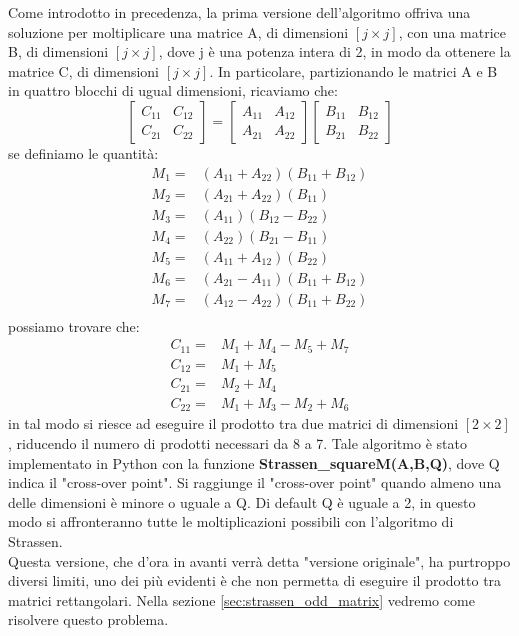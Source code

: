 \documentclass[10pt,a4paper,twoside]{tau-book}
\begin{document}
Come introdotto in precedenza, la prima versione dell'algoritmo offriva una soluzione per moltiplicare una matrice A, di dimensioni $[j\times j]$, con una matrice B, di dimensioni $[j\times j]$, dove j è una potenza intera di 2, in modo da ottenere la matrice C, di dimensioni $[j\times j]$. In particolare, partizionando le matrici A e B in quattro blocchi di ugual dimensioni, ricaviamo che:
\begin{equation}
    \begin{bmatrix} C_{11} & C_{12} \\ C_{21} & C_{22} \end{bmatrix} = \begin{bmatrix} A_{11} & A_{12} \\ A_{21} & A_{22} \end{bmatrix} \begin{bmatrix} B_{11} & B_{12} \\ B_{21} & B_{22} \end{bmatrix}
\end{equation}
se definiamo le quantità:
\begin{equation}
\begin{aligned}
    M_1 =& (A_{11}+A_{22})(B_{11}+B_{12}) \\
    M_2 =& (A_{21}+A_{22})(B_{11}) \\
    M_3 =& (A_{11})(B_{12}-B_{22}) \\
    M_4 =& (A_{22})(B_{21}-B_{11}) \\
    M_5 =& (A_{11}+A_{12})(B_{22}) \\
    M_6 =& (A_{21}-A_{11})(B_{11}+B_{12}) \\
    M_7 =& (A_{12}-A_{22})(B_{11}+B_{22}) \\
\end{aligned}
\end{equation}
possiamo trovare che:
\begin{equation}
\label{eq:strassen_sums}
\begin{aligned}
    C_{11} =& M_1 + M_4 - M_5 + M_7 \\
    C_{12} =& M_1 + M_5 \\
    C_{21} =& M_2 + M_4 \\
    C_{22} =& M_1 + M_3 - M_2 + M_6
\end{aligned}
\end{equation}
in tal modo si riesce ad eseguire il prodotto tra due matrici di dimensioni $[2\times 2]$, riducendo il numero di prodotti necessari da 8 a 7. Tale algoritmo è stato implementato in Python con la funzione \textbf{Strassen\_squareM(A,B,Q)}, dove Q indica il "cross-over point". Si raggiunge il "cross-over point" quando almeno una delle dimensioni è minore o uguale a Q. Di default Q è uguale a 2, in questo modo si affronteranno tutte le moltiplicazioni possibili con l'algoritmo di Strassen. \\
Questa versione, che d'ora in avanti verrà detta "versione originale", ha purtroppo diversi limiti, uno dei più evidenti è che non permetta di eseguire il prodotto tra matrici rettangolari. Nella sezione \ref{sec:strassen_odd_matrix} vedremo come risolvere questo problema.
\end{document}
